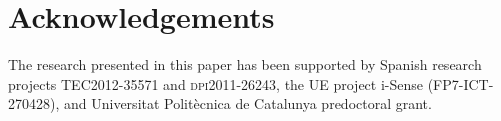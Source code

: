\section{Acknowledgements}


The research presented in this paper has been supported by Spanish
research projects \textsc{TEC2012-35571} and \textsc{dpi2011-26243},
the UE project i-Sense ({\small FP7-ICT-270428}), and Universitat
Polit\`{e}cnica de Catalunya predoctoral grant.








